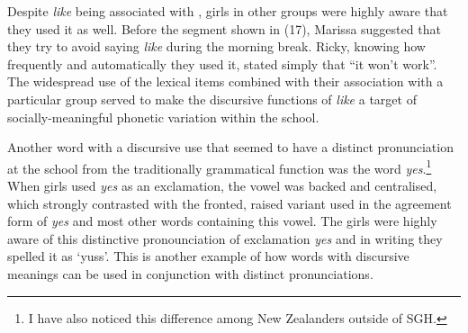 Despite \textit{like} being associated with , girls in other groups were highly aware that they used it as well. Before the segment shown in (17), Marissa suggested that they try to avoid saying \textit{like} during the morning break. Ricky, knowing how frequently and automatically they used it, stated simply that ``it won't work''. The widespread use of the lexical items combined with their association with a particular group served to make the discursive functions of \textit{like} a target of socially-meaningful phonetic variation within the school.





Another word with a discursive use that seemed to have a distinct pronunciation at the school from the traditionally grammatical function was the word \textit{yes}.\footnote{I have also noticed this difference among New Zealanders outside of SGH.} When girls used \textit{yes} as an exclamation, the vowel was backed and centralised, which strongly contrasted with the fronted, raised variant used in the agreement form of \textit{yes} and most other words containing this vowel. The girls were highly aware of this distinctive pronounciation of exclamation \textit{yes} and in writing they spelled it as `yuss'. This is another example of how words with discursive meanings can be used in conjunction with distinct pronunciations.



